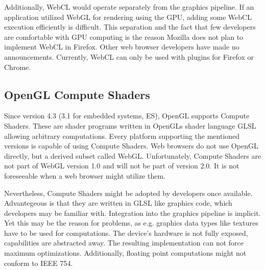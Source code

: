 Additionally, WebCL would operate separately from the graphics pipeline. If an application utilized WebGL for rendering using the GPU, adding some WebCL execution efficiently is difficult. This separation and the fact that few developers are comfortable with GPU computing is the reason Mozilla does not plan to implement WebCL in Firefox. Other web browser developers have made no announcements. Currently, WebCL can only be used with plugins for Firefox or Chrome. \cite{webcl_ff}


\subsection{OpenGL Compute Shaders}

Since version 4.3 (3.1 for embedded systems, ES), OpenGL supports Compute Shaders. These are shader programs written in OpenGLs shader language GLSL allowing arbitrary computations. Every platform supporting the mentioned versions is capable of using Compute Shaders. Web browsers do not use OpenGL directly, but a derived subset called WebGL. Unfortunately, Compute Shaders are not part of WebGL version 1.0 and will not be part of version 2.0. It is not foreseeable when a web browser might utilize them.

Nevertheless, Compute Shaders might be adopted by developers once available. Advantegeous is that they are written in GLSL like graphics code, which developers may be familiar with. Integration into the graphics pipeline is implicit. Yet this may be the reason for problems, as e.g. graphics data types like textures have to be used for computations. The device's hardware is not fully exposed, capabilities are abstracted away. The resulting implementation can not force maximum optimizations. Additionally, floating point computations might not conform to IEEE 754. \cite{opengl_float}
